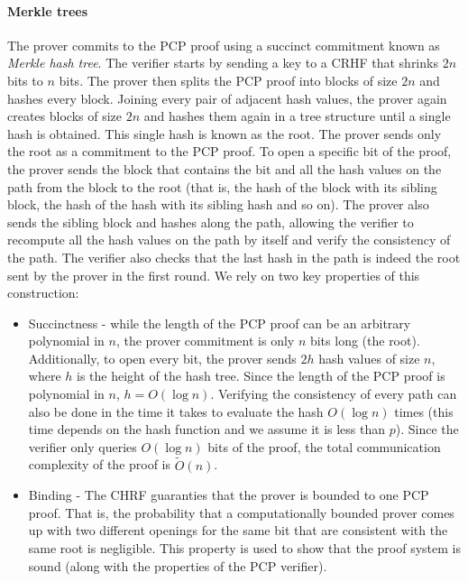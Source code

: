 \documentclass{article}
\begin{document}
\paragraph{Merkle trees} The prover commits to the PCP proof using a succinct commitment known as {\em Merkle hash tree}. The verifier starts by sending a key to a CRHF that shrinks $2n$ bits to $n$ bits. The prover then splits the PCP proof into blocks of size $2n$ and hashes every block. Joining every pair of adjacent hash values, the prover again creates blocks of size $2n$ and hashes them again in a tree structure until a single hash is obtained. This single hash is known as the root. The prover sends only the root as a commitment to the PCP proof. To open a specific bit of the proof, the prover sends the block that contains the bit and all the hash values on the path from the block to the root (that is, the hash of the block with its sibling block, the hash of the hash with its sibling hash and so on). The prover also sends the sibling block and hashes along the path, allowing the verifier to recompute all the hash values on the path by itself and verify the consistency of the path. The verifier also checks that the last hash in the path is indeed the root sent by the prover in the first round. We rely on two key properties of this construction:
\begin{itemize}
\item Succinctness - while the length of the PCP proof can be an arbitrary polynomial in $n$, the prover commitment is only $n$ bits long (the root). Additionally, to open every bit, the prover sends $2h$ hash values of size $n$, where $h$ is the height of the hash tree. Since the length of the PCP proof is polynomial in $n$, $h = O(\log{n})$. Verifying the consistency of every path can also be done in the time it takes to evaluate the hash $O(\log{n})$ times (this time depends on the hash function and we assume it is less than $p$). Since the verifier only queries $O(\log{n})$ bits of the proof, the total communication complexity of the proof is $\tilde O(n)$.

\item Binding - The CHRF guaranties that the prover is bounded to one PCP proof. That is, the probability that a computationally bounded prover comes up with two different openings for the same bit that are consistent with the same root is negligible. This property is used to show that the proof system is sound (along with the properties of the PCP verifier).

\end{itemize}
\end{document}
